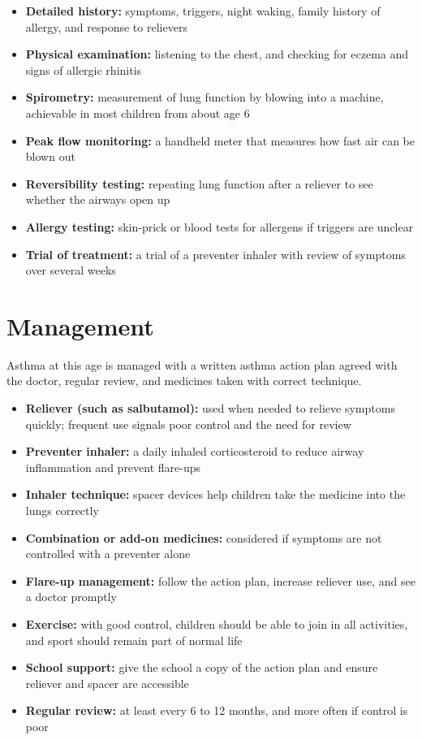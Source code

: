 \begin{itemize}
    \item \textbf{Detailed history:} symptoms, triggers, night waking, family history of allergy, and response to relievers
    \item \textbf{Physical examination:} listening to the chest, and checking for eczema and signs of allergic rhinitis
    \item \textbf{Spirometry:} measurement of lung function by blowing into a machine, achievable in most children from about age 6
    \item \textbf{Peak flow monitoring:} a handheld meter that measures how fast air can be blown out
    \item \textbf{Reversibility testing:} repeating lung function after a reliever to see whether the airways open up
    \item \textbf{Allergy testing:} skin-prick or blood tests for allergens if triggers are unclear
    \item \textbf{Trial of treatment:} a trial of a preventer inhaler with review of symptoms over several weeks
\end{itemize}

\section*{Management}
Asthma at this age is managed with a written asthma action plan agreed with the doctor, regular review, and medicines taken with correct technique.

\begin{itemize}
    \item \textbf{Reliever (such as salbutamol):} used when needed to relieve symptoms quickly; frequent use signals poor control and the need for review
    \item \textbf{Preventer inhaler:} a daily inhaled corticosteroid to reduce airway inflammation and prevent flare-ups
    \item \textbf{Inhaler technique:} spacer devices help children take the medicine into the lungs correctly
    \item \textbf{Combination or add-on medicines:} considered if symptoms are not controlled with a preventer alone
    \item \textbf{Flare-up management:} follow the action plan, increase reliever use, and see a doctor promptly
    \item \textbf{Exercise:} with good control, children should be able to join in all activities, and sport should remain part of normal life
    \item \textbf{School support:} give the school a copy of the action plan and ensure reliever and spacer are accessible
    \item \textbf{Regular review:} at least every 6 to 12 months, and more often if control is poor
\end{itemize}

